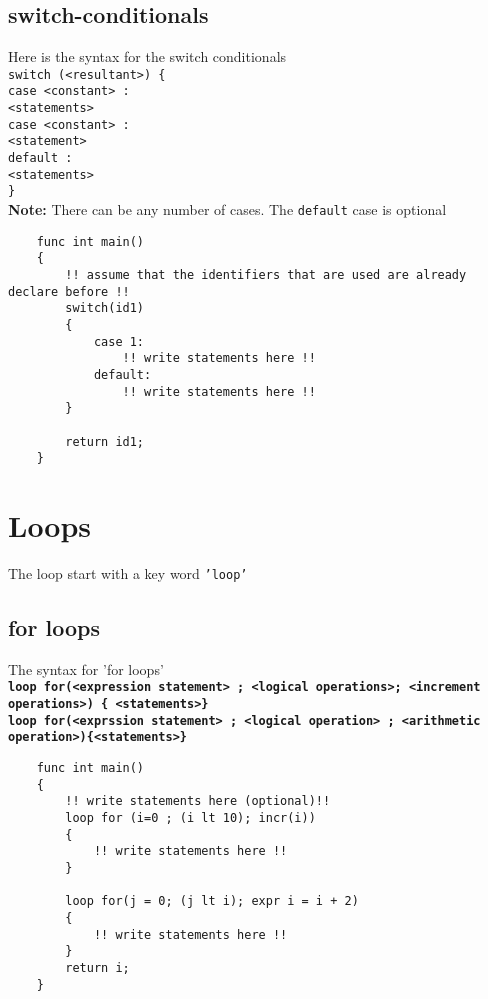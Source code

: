 \documentclass[journal, 18pt]{report}
\begin{document}
\subsection{switch-conditionals}
Here is the syntax for the switch conditionals\\
\texttt{switch (<resultant>) \{ \\
    case <constant> :\\
        <statements>\\
    case <constant> :\\
        <statement>\\
    default :\\
        <statements>\\
    \}}\\

\textbf{Note:}
There can be any number of cases. The \texttt{default} case is optional
\begin{lstlisting}
    func int main()
    {
        !! assume that the identifiers that are used are already declare before !!
        switch(id1)
        {
            case 1:
                !! write statements here !!
            default:
                !! write statements here !!
        }

        return id1;
    }
\end{lstlisting}
\section{Loops}
The loop start with a key word \texttt{'loop'}
\subsection{for loops}
The syntax for 'for loops'\\
\textbf{\texttt{loop for(<expression statement> ; <logical operations>; <increment operations>) \{ <statements>\}}} \\
\textbf{\texttt{loop for(<exprssion statement> ; <logical operation> ; <arithmetic operation>)\{<statements>\}}}
\begin{lstlisting}
    func int main()
    {
        !! write statements here (optional)!!
        loop for (i=0 ; (i lt 10); incr(i))
        {
            !! write statements here !!
        }

        loop for(j = 0; (j lt i); expr i = i + 2)
        {
            !! write statements here !!
        }
        return i;
    }
\end{lstlisting}
\end{document}
